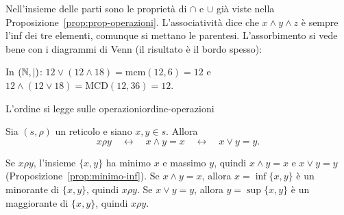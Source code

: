 \begin{spiegazione}
    Nell'insieme delle parti sono le proprietà di $\cap$ e $\cup$ già viste nella Proposizione~\ref{prop:prop-operazioni}. L'associatività dice che
    $x \wedge y \wedge z$ è sempre l'inf dei tre elementi, comunque si mettano le parentesi. L'assorbimento si vede bene con i diagrammi di Venn
    (il risultato è il bordo spesso):
    \begin{center}
    \end{center}
    In $(\mathbb{N}, \mid)$: $12 \vee (12 \wedge 18) = \mathrm{mcm}(12, 6) = 12$ e $12 \wedge (12 \vee 18) = \mathrm{MCD}(12, 36) = 12$.
\end{spiegazione}

\begin{concetto}
\begin{Proposizione}{L'ordine si legge sulle operazioni}{ordine-operazioni}
    \begin{prerequisiti}
    \end{prerequisiti}
    Sia $(s, \rho)$ un reticolo e siano $x, y \in s$. Allora
    \[ x \rho y \quad\leftrightarrow\quad x \wedge y = x \quad\leftrightarrow\quad x \vee y = y. \]
\end{Proposizione}
\begin{dimostrazione}
    Se $x \rho y$, l'insieme $\{x, y\}$ ha minimo $x$ e massimo $y$, quindi $x \wedge y = x$ e $x \vee y = y$ (Proposizione~\ref{prop:minimo-inf}). Se $x \wedge y = x$,
    allora $x = \inf\{x, y\}$ è un minorante di $\{x, y\}$, quindi $x \rho y$. Se $x \vee y = y$, allora $y = \sup\{x, y\}$ è un maggiorante di $\{x, y\}$, quindi $x \rho y$.
\end{dimostrazione}
\end{concetto}

